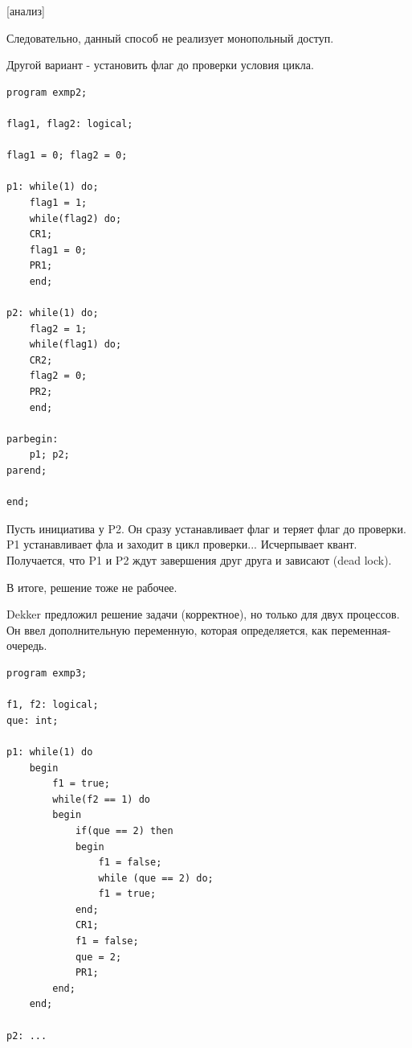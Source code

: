 \documentclass[14pt, a4paper]{article}
\begin{document}
	[анализ]
	
	Следовательно, данный способ не реализует монопольный доступ.
	
	Другой вариант - установить флаг до проверки условия цикла.
	
	\begin{lstlisting}
program exmp2;

flag1, flag2: logical;

flag1 = 0; flag2 = 0;

p1: while(1) do;
	flag1 = 1;
	while(flag2) do;
	CR1;
	flag1 = 0;
	PR1;
	end;

p2: while(1) do;
	flag2 = 1;
	while(flag1) do;
	CR2;
	flag2 = 0;
	PR2;
	end;

parbegin:
	p1; p2;
parend;

end;	
	\end{lstlisting}
	
	Пусть инициатива у P2. Он сразу устанавливает флаг и теряет флаг до проверки. P1 устанавливает фла и заходит в цикл проверки... Исчерпывает квант. Получается, что P1 и P2 ждут завершения друг друга и зависают (dead lock).
	
	В итоге, решение тоже не рабочее.
	
	Dekker предложил решение задачи (корректное), но только для двух процессов. Он ввел дополнительную переменную, которая определяется, как переменная-очередь.
	
	\begin{lstlisting}
program exmp3;

f1, f2: logical;
que: int;

p1: while(1) do
	begin
		f1 = true;
		while(f2 == 1) do
		begin
			if(que == 2) then
			begin 
				f1 = false;
				while (que == 2) do;
				f1 = true;
			end;
			CR1;
			f1 = false;
			que = 2;
			PR1;
		end;
	end;

p2: ...
	\end{lstlisting}
\end{document}
